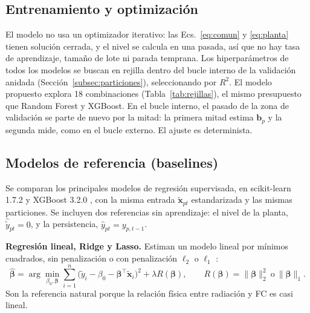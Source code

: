 \documentclass[pdflatex,sn-mathphys-num]{sn-jnl}
\begin{document}

\subsection{Entrenamiento y optimización}\label{subsec:entrenamiento}

El modelo no usa un optimizador iterativo: las Ecs.~\eqref{eq:comun} y \eqref{eq:planta} tienen solución cerrada, y el nivel se calcula en una pasada, así que no hay tasa de aprendizaje, tamaño de lote ni parada temprana. Los hiperparámetros de todos los modelos se buscan en rejilla dentro del bucle interno de la validación anidada (Sección~\ref{subsec:particiones}), seleccionando por $R^2$. El modelo propuesto explora 18 combinaciones (Tabla~\ref{tab:rejillas}), el mismo presupuesto que Random Forest y XGBoost. En el bucle interno, el pasado de la zona de validación se parte de nuevo por la mitad: la primera mitad estima $\mathbf{b}_p$ y la segunda mide, como en el bucle externo. El ajuste es determinista.


\subsection{Modelos de referencia (baselines)}\label{subsec:sota}

Se comparan los principales modelos de regresión supervisada, en scikit-learn 1.7.2 \cite{pedregosa2011sklearn} y XGBoost 3.2.0 \cite{chen2016xgboost}, con la misma entrada $\tilde{\mathbf{x}}_{pt}$ estandarizada y las mismas particiones. Se incluyen dos referencias sin aprendizaje: el nivel de la planta, $\hat{\tilde{y}}_{pt} = 0$, y la persistencia, $\hat{y}_{pt} = y_{p,t-1}$.

\textbf{Regresión lineal, Ridge y Lasso.} Estiman un modelo lineal por mínimos cuadrados, sin penalización o con penalización $\ell_2$ o $\ell_1$ \cite{hoerl1970ridge,tibshirani1996lasso}:
\begin{equation}
\hat{\boldsymbol{\beta}} = \arg\min_{\beta_0,\boldsymbol{\beta}} \sum_{i=1}^{n}\bigl(\tilde{y}_i - \beta_0 - \boldsymbol{\beta}^\top\tilde{\mathbf{x}}_i\bigr)^2 + \lambda R(\boldsymbol{\beta}), \qquad R(\boldsymbol{\beta}) = \lVert\boldsymbol{\beta}\rVert_2^2 \ \text{o}\ \lVert\boldsymbol{\beta}\rVert_1 .
\label{eq:ridge_lasso}
\end{equation}
Son la referencia natural porque la relación física entre radiación y FC es casi lineal.
\end{document}
